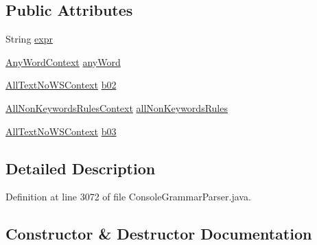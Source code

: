 \subsection*{Public Attributes}
\begin{DoxyCompactItemize}
\item 
String \hyperlink{classgov_1_1nasa_1_1jpf_1_1inspector_1_1client_1_1parser_1_1_console_grammar_parser_1_1_all_text_no_w_s_context_a1157742947f1a47c7e7ed2856f080e25}{expr}
\item 
\hyperlink{classgov_1_1nasa_1_1jpf_1_1inspector_1_1client_1_1parser_1_1_console_grammar_parser_1_1_any_word_context}{Any\+Word\+Context} \hyperlink{classgov_1_1nasa_1_1jpf_1_1inspector_1_1client_1_1parser_1_1_console_grammar_parser_1_1_all_text_no_w_s_context_a16341830d33aa9e146963275622d944c}{any\+Word}
\item 
\hyperlink{classgov_1_1nasa_1_1jpf_1_1inspector_1_1client_1_1parser_1_1_console_grammar_parser_1_1_all_text_no_w_s_context}{All\+Text\+No\+W\+S\+Context} \hyperlink{classgov_1_1nasa_1_1jpf_1_1inspector_1_1client_1_1parser_1_1_console_grammar_parser_1_1_all_text_no_w_s_context_a3924ca1481ca5dc03f8b5fa87219b06c}{b02}
\item 
\hyperlink{classgov_1_1nasa_1_1jpf_1_1inspector_1_1client_1_1parser_1_1_console_grammar_parser_1_1_all_non_keywords_rules_context}{All\+Non\+Keywords\+Rules\+Context} \hyperlink{classgov_1_1nasa_1_1jpf_1_1inspector_1_1client_1_1parser_1_1_console_grammar_parser_1_1_all_text_no_w_s_context_acc2446728e7aa13d078f93535b5b6618}{all\+Non\+Keywords\+Rules}
\item 
\hyperlink{classgov_1_1nasa_1_1jpf_1_1inspector_1_1client_1_1parser_1_1_console_grammar_parser_1_1_all_text_no_w_s_context}{All\+Text\+No\+W\+S\+Context} \hyperlink{classgov_1_1nasa_1_1jpf_1_1inspector_1_1client_1_1parser_1_1_console_grammar_parser_1_1_all_text_no_w_s_context_ab9506f66e6cfaf85fcb0fc0fbe6e7098}{b03}
\end{DoxyCompactItemize}


\subsection{Detailed Description}


Definition at line 3072 of file Console\+Grammar\+Parser.\+java.



\subsection{Constructor \& Destructor Documentation}

